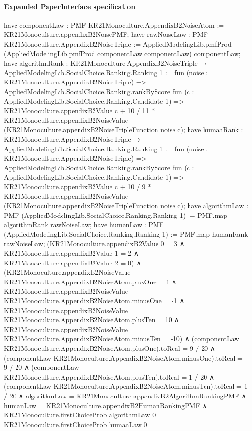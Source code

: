 \documentclass[10pt]{article}
\begin{document}
\paragraph{Expanded PaperInterface specification}
\begin{ReviewVerbatim}
have componentLaw : PMF KR21Monoculture.AppendixB2NoiseAtom := KR21Monoculture.appendixB2NoisePMF;
have rawNoiseLaw : PMF KR21Monoculture.AppendixB2NoiseTriple :=
  AppliedModelingLib.pmfProd (AppliedModelingLib.pmfProd componentLaw componentLaw) componentLaw;
have algorithmRank : KR21Monoculture.AppendixB2NoiseTriple → AppliedModelingLib.SocialChoice.Ranking.Ranking 1 :=
  fun (noise : KR21Monoculture.AppendixB2NoiseTriple) =>
  AppliedModelingLib.SocialChoice.Ranking.rankByScore fun (c : AppliedModelingLib.SocialChoice.Ranking.Candidate 1) =>
    KR21Monoculture.appendixB2Value c +
      10 / 11 * KR21Monoculture.appendixB2NoiseValue (KR21Monoculture.appendixB2NoiseTripleFunction noise c);
have humanRank : KR21Monoculture.AppendixB2NoiseTriple → AppliedModelingLib.SocialChoice.Ranking.Ranking 1 :=
  fun (noise : KR21Monoculture.AppendixB2NoiseTriple) =>
  AppliedModelingLib.SocialChoice.Ranking.rankByScore fun (c : AppliedModelingLib.SocialChoice.Ranking.Candidate 1) =>
    KR21Monoculture.appendixB2Value c +
      10 / 9 * KR21Monoculture.appendixB2NoiseValue (KR21Monoculture.appendixB2NoiseTripleFunction noise c);
have algorithmLaw : PMF (AppliedModelingLib.SocialChoice.Ranking.Ranking 1) := PMF.map algorithmRank rawNoiseLaw;
have humanLaw : PMF (AppliedModelingLib.SocialChoice.Ranking.Ranking 1) := PMF.map humanRank rawNoiseLaw;
(KR21Monoculture.appendixB2Value 0 = 3 ∧
    KR21Monoculture.appendixB2Value 1 = 2 ∧ KR21Monoculture.appendixB2Value 2 = 0) ∧
  (KR21Monoculture.appendixB2NoiseValue KR21Monoculture.AppendixB2NoiseAtom.plusOne = 1 ∧
      KR21Monoculture.appendixB2NoiseValue KR21Monoculture.AppendixB2NoiseAtom.minusOne = -1 ∧
        KR21Monoculture.appendixB2NoiseValue KR21Monoculture.AppendixB2NoiseAtom.plusTen = 10 ∧
          KR21Monoculture.appendixB2NoiseValue KR21Monoculture.AppendixB2NoiseAtom.minusTen = -10) ∧
    (componentLaw KR21Monoculture.AppendixB2NoiseAtom.plusOne).toReal = 9 / 20 ∧
      (componentLaw KR21Monoculture.AppendixB2NoiseAtom.minusOne).toReal = 9 / 20 ∧
        (componentLaw KR21Monoculture.AppendixB2NoiseAtom.plusTen).toReal = 1 / 20 ∧
          (componentLaw KR21Monoculture.AppendixB2NoiseAtom.minusTen).toReal = 1 / 20 ∧
            algorithmLaw = KR21Monoculture.appendixB2AlgorithmRankingPMF ∧
              humanLaw = KR21Monoculture.appendixB2HumanRankingPMF ∧
                KR21Monoculture.firstChoiceProb algorithmLaw 0 = KR21Monoculture.firstChoiceProb humanLaw 0
\end{ReviewVerbatim}
\end{document}
